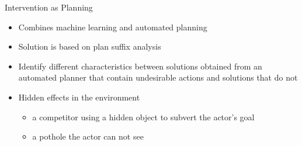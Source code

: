 \begin{frame}{Intervention as Planning}
\begin{itemize}
\item Combines machine learning and automated planning
\item Solution is based on plan suffix analysis
\item Identify different characteristics between solutions obtained from an automated planner that contain undesirable actions and solutions that do not
\item Hidden effects in the environment
\begin{itemize}
\item a competitor using a hidden object to subvert the actor's goal
\item a pothole the actor can not see
\end{itemize}
\end{itemize}
\end{frame}